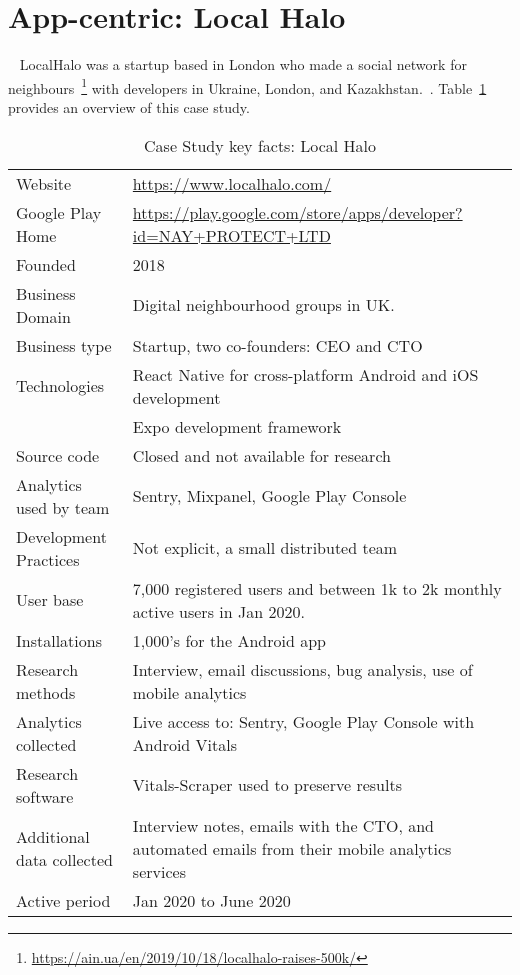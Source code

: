 
\section{App-centric: Local Halo}~\label{case-study-overview-localhalo}
LocalHalo was a startup based in London who made a social network for neighbours~\footnote{\url{https://ain.ua/en/2019/10/18/localhalo-raises-500k/}} with developers in Ukraine, London, and Kazakhstan.~\citep{karpenko2019_localhalo_a_social_network_for_neighbors}. 
Table~\ref{tab:local_halo_anaytics_overview} provides an overview of this case study.

{\renewcommand{\arraystretch}{0.8}%
\begin{table}[htbp!]
    \centering
    \small
    \setlength{\tabcolsep}{6pt}
    \begin{tabular}{lp{11cm}}
       \toprule
       Website &\url{https://www.localhalo.com/} \\
       Google Play Home & \url{https://play.google.com/store/apps/developer?id=NAY+PROTECT+LTD} \\
       Founded &2018 \\
       Business Domain &Digital neighbourhood groups in UK.\\
       Business type &Startup, two co-founders: CEO and CTO \\
       Technologies  &React Native for cross-platform Android and iOS development \\
       &Expo development framework \\
       Source code  &Closed and not available for research \\
       Analytics used by team &Sentry, Mixpanel, Google Play Console \\
       Development Practices &Not explicit, a small distributed team \\
       \midrule
       User base &7,000 registered users and between 1k to 2k monthly active users in Jan 2020. \\
       Installations &1,000's for the Android app \\
       \midrule
       Research methods &Interview, email discussions, bug analysis, use of mobile analytics \\
       Analytics collected &Live access to: Sentry, Google Play Console with Android Vitals \\
       Research software &Vitals-Scraper used to preserve results \\
       Additional data collected &Interview notes, emails with the CTO, and automated emails from their mobile analytics services \\
       Active period &Jan 2020 to June 2020 \\
       \bottomrule
    \end{tabular}
    \caption{Case Study key facts: Local Halo}
    \label{tab:local_halo_anaytics_overview}
\end{table}
}

